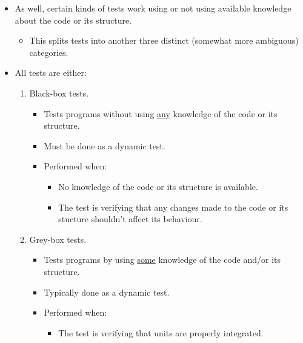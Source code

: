 \documentclass{article}
\begin{document}
\begin{itemize}
\begin{enumerate}
\begin{itemize}
		\end{itemize}
		\item Static tests.
		\begin{itemize}
			\item Tests programs \underline{without} executing them.
			\item Used to catch bugs early and perform code linting.
			\item Should be performed prior to any dynamic tests.
		\end{itemize}
	\end{enumerate}
	\item As well, certain kinds of tests work using or not using available knowledge about the code or its structure.
	\begin{itemize}
		\item This splits tests into another three distinct (somewhat more ambiguous) categories.
	\end{itemize}
	\item All tests are either:
	\begin{enumerate}
		\item Black-box tests.
		\begin{itemize}
			\item Tests programs without using \underline{any} knowledge of the code or its structure.
			\item Must be done as a dynamic test.
			\item Performed when:
			\begin{itemize}
				\item No knowledge of the code or its structure is available.
				\item The test is verifying that any changes made to the code or its stucture shouldn't affect its behaviour.
			\end{itemize}
		\end{itemize}
		\item Grey-box tests.
		\begin{itemize}
			\item Tests programs by using \underline{some} knowledge of the code and/or its structure.
			\item Typically done as a dynamic test.
			\item Performed when:
			\begin{itemize}
				\item The test is verifying that units are properly integrated.
			\end{itemize}
		\end{itemize}

\end{enumerate}
\end{itemize}
\end{document}

